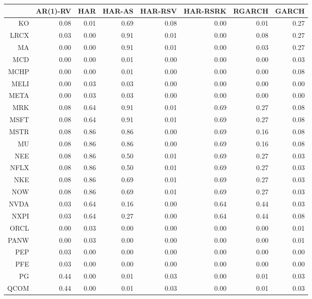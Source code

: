 \begin{table}[ht]
\centering
\begin{tabular}{rrrrrrrr}
  \hline
 & AR(1)-RV & HAR & HAR-AS & HAR-RSV & HAR-RSRK & RGARCH & GARCH \\ 
  \hline
KO & 0.08 & 0.01 & 0.69 & 0.08 & 0.00 & 0.01 & 0.27 \\ 
  LRCX & 0.03 & 0.00 & 0.91 & 0.01 & 0.00 & 0.08 & 0.27 \\ 
  MA & 0.00 & 0.00 & 0.91 & 0.01 & 0.00 & 0.03 & 0.27 \\ 
  MCD & 0.00 & 0.00 & 0.01 & 0.00 & 0.00 & 0.00 & 0.03 \\ 
  MCHP & 0.00 & 0.00 & 0.01 & 0.00 & 0.00 & 0.00 & 0.08 \\ 
  MELI & 0.00 & 0.03 & 0.03 & 0.00 & 0.00 & 0.00 & 0.00 \\ 
  META & 0.00 & 0.03 & 0.03 & 0.00 & 0.00 & 0.00 & 0.00 \\ 
  MRK & 0.08 & 0.64 & 0.91 & 0.01 & 0.69 & 0.27 & 0.08 \\ 
  MSFT & 0.08 & 0.64 & 0.91 & 0.01 & 0.69 & 0.27 & 0.08 \\ 
  MSTR & 0.08 & 0.86 & 0.86 & 0.00 & 0.69 & 0.16 & 0.08 \\ 
  MU & 0.08 & 0.86 & 0.86 & 0.00 & 0.69 & 0.16 & 0.08 \\ 
  NEE & 0.08 & 0.86 & 0.50 & 0.01 & 0.69 & 0.27 & 0.03 \\ 
  NFLX & 0.08 & 0.86 & 0.50 & 0.01 & 0.69 & 0.27 & 0.03 \\ 
  NKE & 0.08 & 0.86 & 0.69 & 0.01 & 0.69 & 0.27 & 0.03 \\ 
  NOW & 0.08 & 0.86 & 0.69 & 0.01 & 0.69 & 0.27 & 0.03 \\ 
  NVDA & 0.03 & 0.64 & 0.16 & 0.00 & 0.64 & 0.44 & 0.03 \\ 
  NXPI & 0.03 & 0.64 & 0.27 & 0.00 & 0.64 & 0.44 & 0.08 \\ 
  ORCL & 0.00 & 0.03 & 0.00 & 0.00 & 0.00 & 0.00 & 0.01 \\ 
  PANW & 0.00 & 0.03 & 0.00 & 0.00 & 0.00 & 0.00 & 0.01 \\ 
  PEP & 0.03 & 0.00 & 0.00 & 0.00 & 0.00 & 0.00 & 0.00 \\ 
  PFE & 0.03 & 0.00 & 0.00 & 0.00 & 0.00 & 0.00 & 0.00 \\ 
  PG & 0.44 & 0.00 & 0.01 & 0.03 & 0.00 & 0.01 & 0.03 \\ 
  QCOM & 0.44 & 0.00 & 0.01 & 0.03 & 0.00 & 0.01 & 0.03 \\ 

\end{tabular}
\end{table}

